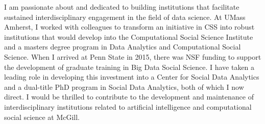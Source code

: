\documentclass[a4paper,12pt]{article}
\begin{document}
I am passionate about and dedicated to building institutions that facilitate sustained interdisciplinary engagement in the field of data science. At UMass Amherst, I worked with colleagues to transform an initiative in CSS into robust institutions that would develop into the Computational Social Science Institute and a masters degree program in Data Analytics and Computational Social Science. When I arrived at Penn State in 2015, there was NSF funding to support the development of graduate training in Big Data Social Science. I have taken a leading role in developing this investment into a Center for Social Data Analytics and a dual-title PhD program in Social Data Analytics, both of which I now direct. I would be thrilled to contribute to the development and maintenance of interdisciplinary institutions related to artificial intelligence and computational social science at McGill. 
\end{document}
